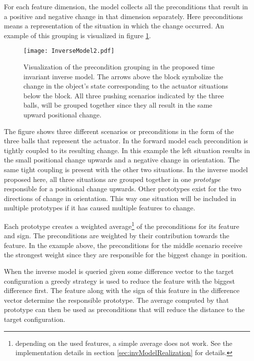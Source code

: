 For each feature dimension, the model collects all the preconditions that result in a positive and negative change in that dimension separately. Here preconditions means a representation of the situation in which the change occurred.  
An example of this grouping is visualized in figure \ref{fig:InverseModel}. 

\begin{figure}
	\centering
	\texttt{[image: InverseModel2.pdf]}
	\caption{Visualization of the precondition grouping in the proposed time invariant inverse model. The arrows above the block symbolize the change in the object's state corresponding to the actuator situations below the block. All three pushing scenarios indicated by the three balls, will be grouped together since they all result in the same upward positional change.}
	\label{fig:InverseModel}
\end{figure}

The figure shows three different scenarios or preconditions in the form of the three balls that represent the actuator. In the forward model each precondition is tightly coupled to its resulting change. In this example the left situation results in the small positional change upwards and a negative change in orientation. The same tight coupling is present with the other two situations. In the inverse model proposed here, all three situations are grouped together in one \textit{prototype} responsible for a positional change upwards. Other prototypes exist for the two directions of change in orientation. This way one situation will be included in multiple prototypes if it has caused multiple features to change.

Each prototype creates a weighted average\footnote{depending on the used features, a simple average does not work. See the implementation details in section \ref{sec:invModelRealization} for details.} of the preconditions for its feature and sign. The preconditions are weighted by their contribution towards the feature. In the example above, the preconditions for the middle scenario receive the strongest weight since they are responsible for the biggest change in position. 

When the inverse model is queried given some difference vector to the target configuration a greedy strategy is used to reduce the feature with the biggest difference first. 
The feature along with the sign of this feature in the difference vector determine the responsible prototype. The average computed by that prototype can then be used as preconditions that will reduce the distance to the target configuration.



	

